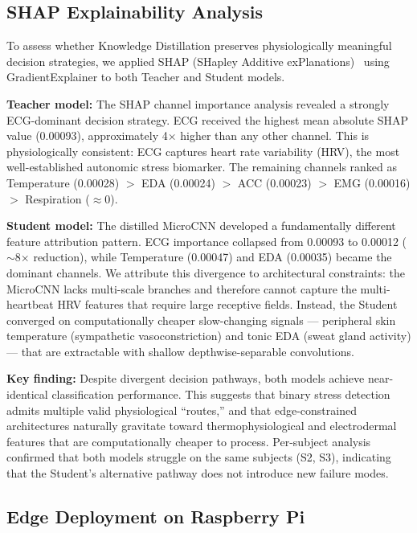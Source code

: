 \documentclass[conference]{IEEEtran}
\begin{document}
\subsection{SHAP Explainability Analysis}

To assess whether Knowledge Distillation preserves physiologically meaningful decision strategies, we applied SHAP (SHapley Additive exPlanations)~\cite{lundberg2017unified} using GradientExplainer to both Teacher and Student models.

\textbf{Teacher model:} The SHAP channel importance analysis revealed a strongly ECG-dominant decision strategy. ECG received the highest mean absolute SHAP value (0.00093), approximately 4$\times$ higher than any other channel. This is physiologically consistent: ECG captures heart rate variability (HRV), the most well-established autonomic stress biomarker. The remaining channels ranked as Temperature (0.00028) $>$ EDA (0.00024) $>$ ACC (0.00023) $>$ EMG (0.00016) $>$ Respiration ($\approx$0).

\textbf{Student model:} The distilled MicroCNN developed a fundamentally different feature attribution pattern. ECG importance collapsed from 0.00093 to 0.00012 ($\sim$8$\times$ reduction), while Temperature (0.00047) and EDA (0.00035) became the dominant channels. We attribute this divergence to architectural constraints: the MicroCNN lacks multi-scale branches and therefore cannot capture the multi-heartbeat HRV features that require large receptive fields. Instead, the Student converged on computationally cheaper slow-changing signals --- peripheral skin temperature (sympathetic vasoconstriction) and tonic EDA (sweat gland activity) --- that are extractable with shallow depthwise-separable convolutions.

\textbf{Key finding:} Despite divergent decision pathways, both models achieve near-identical classification performance. This suggests that binary stress detection admits multiple valid physiological ``routes,'' and that edge-constrained architectures naturally gravitate toward thermophysiological and electrodermal features that are computationally cheaper to process. Per-subject analysis confirmed that both models struggle on the same subjects (S2, S3), indicating that the Student's alternative pathway does not introduce new failure modes.

\subsection{Edge Deployment on Raspberry Pi}
\end{document}
